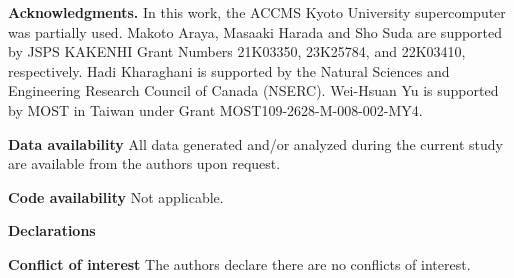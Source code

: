 \documentclass[12pt]{article}
\theoremstyle{remark}
\begin{document}
\bigskip
\noindent
\textbf{Acknowledgments.}
In this work, the ACCMS Kyoto University supercomputer was partially used.
Makoto Araya, Masaaki Harada and Sho Suda are
supported by JSPS KAKENHI Grant Numbers 21K03350, 23K25784, and
22K03410, respectively.
Hadi Kharaghani is supported by the Natural Sciences and
Engineering  Research Council of Canada (NSERC). 
Wei-Hsuan Yu is supported by  MOST  in  Taiwan under  Grant  MOST109-2628-M-008-002-MY4.



\bigskip
\noindent
\textbf{Data availability} 
All data generated and/or analyzed during the current study are available
from the authors upon request.

\bigskip
\noindent
\textbf{Code availability} Not applicable.

\bigskip
\noindent
\textbf{Declarations}

\noindent
\textbf{Conflict of interest} The authors declare there are no conflicts of interest.
\end{document}
